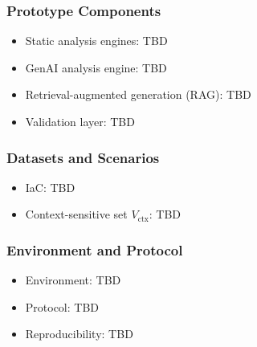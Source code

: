 \subsubsection*{Prototype Components}
\begin{itemize}
	\item Static analysis engines: TBD %
	\item GenAI analysis engine: TBD %
	\item Retrieval-augmented generation (RAG): TBD %
	\item Validation layer: TBD %
\end{itemize}

\subsubsection*{Datasets and Scenarios}
\begin{itemize}
	\item IaC: TBD %
	\item Context-sensitive set $V_{\text{ctx}}$: TBD %
\end{itemize}


\subsubsection*{Environment and Protocol}
\begin{itemize}
	\item Environment: TBD %
	\item Protocol: TBD %
	\item Reproducibility: TBD %
\end{itemize}

